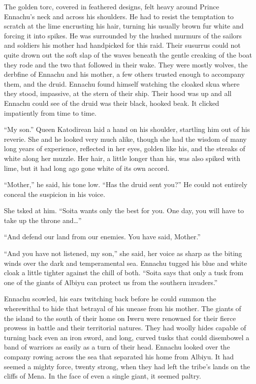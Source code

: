 The golden torc, covered in feathered designs, felt heavy around Prince Ennachu's neck and across his shoulders. He had to resist the temptation to scratch at the lime encrusting his hair, turning his usually brown fur white and forcing it into spikes. He was surrounded by the hushed murmurs of the sailors and soldiers his mother had handpicked for this raid. Their susurrus could not quite drown out the soft slap of the waves beneath the gentle creaking of the boat they rode and the two that followed in their wake. They were mostly wolves, the derbfine of Ennachu and his mother, a few others trusted enough to accompany them, and the druid. Ennachu found himself watching the cloaked skua where they stood, impassive, at the stern of their ship. Their hood was up and all Ennachu could see of the druid was their black, hooked beak. It clicked impatiently from time to time.

``My son.'' Queen Katodirean laid a hand on his shoulder, startling him out of his reverie. She and he looked very much alike, though she had the wisdom of many long years of experience, reflected in her eyes, golden like his, and the streaks of white along her muzzle. Her hair, a little longer than his, was also spiked with lime, but it had long ago gone white of its own accord.

``Mother,'' he said, his tone low. ``Has the druid sent you?'' He could not entirely conceal the suspicion in his voice.

She tsked at him. ``Soita wants only the best for you. One day, you will have to take up the throne and\ldots''

``And defend our land from our enemies. You have said, Mother.''

``And you have not listened, my son,'' she said, her voice as sharp as the biting winds over the dark and temperamental sea. Ennachu tugged his blue and white cloak a little tighter against the chill of both. ``Soita says that only a tusk from one of the giants of Albiyu can protect us from the southern invaders.''

Ennachu scowled, his ears twitching back before he could summon the wherewithal to hide that betrayal of his unease from his mother. The giants of the island to the south of their home on Iweru were renowned for their fierce prowess in battle and their territorial natures. They had woolly hides capable of turning back even an iron sword, and long, curved tusks that could disembowel a band of warriors as easily as a turn of their head. Ennachu looked over the company rowing across the sea that separated his home from Albiyu. It had seemed a mighty force, twenty strong, when they had left the tribe's lands on the cliffs of Mena. In the face of even a single giant, it seemed paltry.

